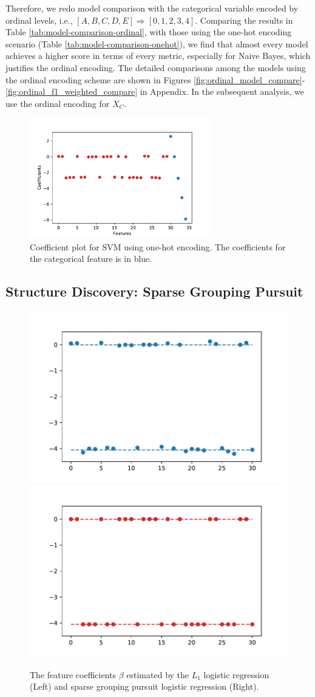 \documentclass[11pt]{article}
\begin{document}
Therefore, we redo model comparison with the categorical variable encoded by ordinal levels, i.e., $[A, B, C, D, E] \Rightarrow [0, 1, 2, 3, 4]$. Comparing the results in Table \ref{tab:model-comparison-ordinal}, with those using the one-hot encoding scenario (Table \ref{tab:model-comparison-onehot}), we find that almost every model achieves a higher score in terms of every metric, especially for Naive Bayes, which justifies the ordinal encoding. The detailed comparisons among the models using the ordinal encoding scheme are shown in Figures \ref{fig:ordinal_model_compare}-\ref{fig:ordinal_f1_weighted_compare} in Appendix.
In the subsequent analysis, we use the ordinal encoding for $X_C$. 

\begin{figure}[H]
    \centering
    \includegraphics[width=0.7\textwidth]{svm_coef.pdf}
    \caption{Coefficient plot for SVM using one-hot encoding. The coefficients for the categorical feature is in blue.}
    \label{fig:svm-coef}
\end{figure}




\subsection{Structure Discovery: Sparse Grouping Pursuit}

\begin{figure}[H]
    \centering
    \includegraphics[width=.49\textwidth]{ungroup_coef.pdf}
    \includegraphics[width=.49\textwidth]{group_coef.pdf}
    \caption{The feature coefficients $\beta$ estimated by the $L_1$ logistic regression (Left) and sparse grouping pursuit logistic regression (Right).}
    \label{fig:coefs}
\end{figure}
\end{document}
